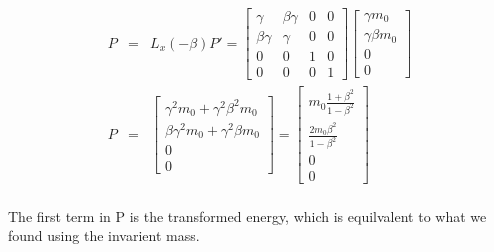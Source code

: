 \documentclass[11pt]{amsart}
\begin{document}
\begin{eqnarray*}
P &=& L_{x}(-\beta)P' =\begin{bmatrix}
	\gamma & \beta\gamma & 0 & 0 \\
	\beta\gamma & \gamma & 0 & 0 \\
	0 & 0 & 1 & 0 \\
	0 & 0 & 0 & 1 
	\end{bmatrix}\begin{bmatrix}
	\gamma{m_{0}} \\
	\gamma\beta{m_{0}} \\
	0 \\
	0 
	\end{bmatrix} \\
P &=& \begin{bmatrix}
	\gamma^{2}m_{0}+\gamma^{2}\beta^{2}m_{0} \\
	\beta\gamma^{2}m_{0}+\gamma^{2}\beta{m_{0}} \\
	0 \\
	0 
	\end{bmatrix} = \begin{bmatrix}
	m_{0}\frac{1+\beta^{2}}{1-\beta^{2}} \\
	\frac{2m_{0}\beta^{2}}{1-\beta^{2}} \\
	0 \\
	0 
	\end{bmatrix}
	\end{eqnarray*} \\
The first term in P is the transformed energy, which is equilvalent to what we found using the invarient mass. \\
\end{document}
